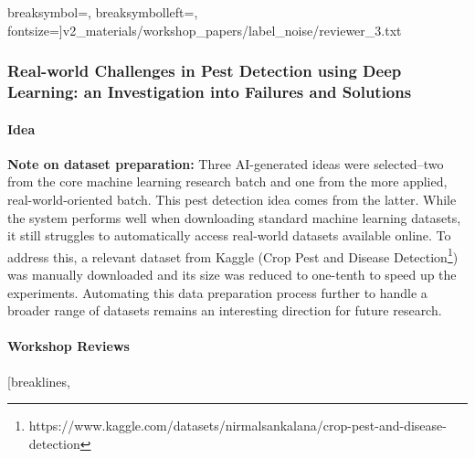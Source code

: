 \begin{appendices}
\begin{tcolorbox}[
  breakable,
  colback  = green!5!white,
  colframe = green!75!black,
  title    = {\small Reviewer \#2: Official Review for Submission41},
  fontupper=\scriptsize\ttfamily,
]
               breaksymbol={},
               breaksymbolleft={},
               fontsize=\scriptsize]{v2_materials/workshop_papers/label_noise/reviewer_3.txt}
\end{tcolorbox}

\clearpage

\subsubsection{Real-world Challenges in Pest Detection using Deep Learning: an Investigation into Failures and Solutions}

\paragraph{\ouralgo Idea}
\begin{tcolorbox}[
  breakable,
  colback  = blue!5!white,
  colframe = blue!75!black,
  title    = {Idea},
  fontupper=\scriptsize\ttfamily,
]
\end{tcolorbox}


\textbf{Note on dataset preparation:}
Three AI-generated ideas were selected--two from the core machine learning research batch and one from the more applied, real-world-oriented batch. This pest detection idea comes from the latter.
While the system performs well when downloading standard machine learning datasets, it still struggles to automatically access real-world datasets available online. To address this, a relevant dataset from Kaggle (Crop Pest and Disease Detection\footnote{https://www.kaggle.com/datasets/nirmalsankalana/crop-pest-and-disease-detection}) was manually downloaded and its size was reduced to one-tenth to speed up the experiments.
Automating this data preparation process further to handle a broader range of datasets remains an interesting direction for future research.


\label{paper:pest_detection}



\newpage
\paragraph{Workshop Reviews}
\begin{tcolorbox}[
  breakable,
  colback  = green!5!white,
  colframe = green!75!black,
  title    = {\small Reviewer \#1: Review of Real-World Challenges in Pest Detection Using Deep Learning: An Investigation into Failures and Solutions.},
  fontupper=\scriptsize\ttfamily,
]
\VerbatimInput[breaklines,


\end{tcolorbox}
\end{appendices}
